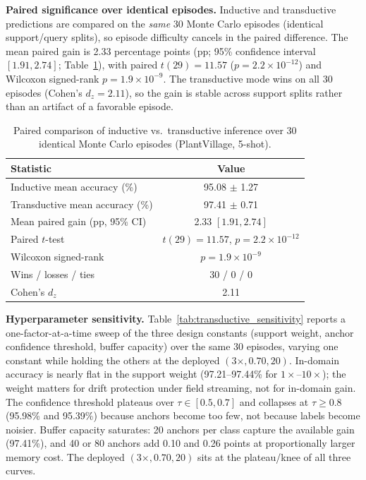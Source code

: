 \documentclass[preprint,12pt]{elsarticle}
\begin{document}
\textbf{Paired significance over identical episodes.} Inductive and transductive predictions are compared on the \emph{same} 30 Monte Carlo episodes (identical support/query splits), so episode difficulty cancels in the paired difference. The mean paired gain is 2.33 percentage points (pp; 95\% confidence interval $[1.91, 2.74]$; Table~\ref{tab:paired_test}), with paired $t(29) = 11.57$ ($p = 2.2 \times 10^{-12}$) and Wilcoxon signed-rank $p = 1.9 \times 10^{-9}$. The transductive mode wins on all 30 episodes (Cohen's $d_z = 2.11$), so the gain is stable across support splits rather than an artifact of a favorable episode.

\begin{table}[htbp]
\caption{Paired comparison of inductive vs.\ transductive inference over 30 identical Monte Carlo episodes (PlantVillage, 5-shot).}
\label{tab:paired_test}
\centering

\footnotesize
\setlength{\tabcolsep}{4pt}
\begin{tabular*}{\columnwidth}{@{\extracolsep{\fill}}lc}
\toprule
\textbf{Statistic} & \textbf{Value} \\
\midrule
Inductive mean accuracy (\%) & 95.08 $\pm$ 1.27 \\
Transductive mean accuracy (\%) & 97.41 $\pm$ 0.71 \\
Mean paired gain (pp, 95\% CI) & 2.33 $[1.91, 2.74]$ \\
Paired $t$-test & $t(29)=11.57$, $p=2.2\times10^{-12}$ \\
Wilcoxon signed-rank & $p=1.9\times10^{-9}$ \\
Wins / losses / ties & 30 / 0 / 0 \\
Cohen's $d_z$ & 2.11 \\
\bottomrule
\end{tabular*}
\end{table}

\textbf{Hyperparameter sensitivity.} Table~\ref{tab:transductive_sensitivity} reports a one-factor-at-a-time sweep of the three design constants (support weight, anchor confidence threshold, buffer capacity) over the same 30 episodes, varying one constant while holding the others at the deployed $(3\times, 0.70, 20)$. In-domain accuracy is nearly flat in the support weight (97.21--97.44\% for $1\times$--$10\times$); the weight matters for drift protection under field streaming, not for in-domain gain. The confidence threshold plateaus over $\tau \in [0.5, 0.7]$ and collapses at $\tau \ge 0.8$ (95.98\% and 95.39\%) because anchors become too few, not because labels become noisier. Buffer capacity saturates: 20 anchors per class capture the available gain (97.41\%), and 40 or 80 anchors add 0.10 and 0.26 points at proportionally larger memory cost. The deployed $(3\times, 0.70, 20)$ sits at the plateau/knee of all three curves.
\end{document}
